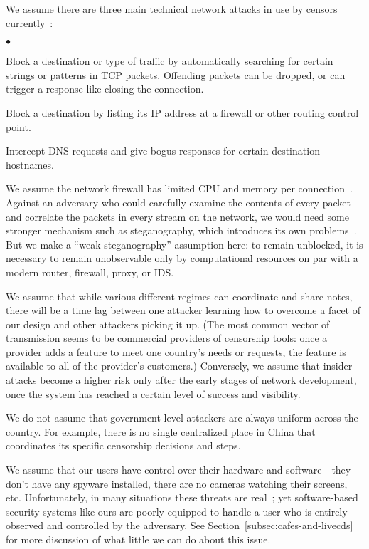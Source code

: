 \documentclass{llncs}
\newenvironment{tightlist}{\begin{list}{$\bullet$}{
  \setlength{\itemsep}{0mm}
    \setlength{\parsep}{0mm}
    }}{\end{list}}
\begin{document}
We assume there are three main technical network attacks in use by censors
currently~\cite{clayton:pet2006}:

\begin{tightlist}
\item Block a destination or type of traffic by automatically searching for
  certain strings or patterns in TCP packets.  Offending packets can be
  dropped, or can trigger a response like closing the
  connection.
\item Block a destination by listing its IP address at a
  firewall or other routing control point.
\item Intercept DNS requests and give bogus responses for certain
  destination hostnames.
\end{tightlist}

We assume the network firewall has limited CPU and memory per
connection~\cite{clayton:pet2006}.  Against an adversary who could carefully
examine the contents of every packet and correlate the packets in every
stream on the network, we would need some stronger mechanism such as
steganography, which introduces its own
problems~\cite{active-wardens,tcpstego}.  But we make a ``weak
steganography'' assumption here: to remain unblocked, it is necessary to
remain unobservable only by computational resources on par with a modern
router, firewall, proxy, or IDS.

We assume that while various different regimes can coordinate and share
notes, there will be a time lag between one attacker learning how to overcome
a facet of our design and other attackers picking it up.  (The most common
vector of transmission seems to be commercial providers of censorship tools:
once a provider adds a feature to meet one country's needs or requests, the
feature is available to all of the provider's customers.)  Conversely, we
assume that insider attacks become a higher risk only after the early stages
of network development, once the system has reached a certain level of
success and visibility.

We do not assume that government-level attackers are always uniform across
the country. For example, there is no single centralized place in China
that coordinates its specific censorship decisions and steps.

We assume that our users have control over their hardware and
software---they don't have any spyware installed, there are no
cameras watching their screens, etc. Unfortunately, in many situations
these threats are real~\cite{zuckerman-threatmodels}; yet
software-based security systems like ours are poorly equipped to handle
a user who is entirely observed and controlled by the adversary. See
Section~\ref{subsec:cafes-and-livecds} for more discussion of what little
we can do about this issue.
\end{document}
